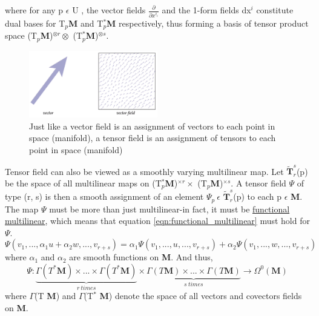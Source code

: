 where for any p $\epsilon$ U , the vector fields $\frac{\partial}{\partial x^{i_i}}$ and the 1-form fields dx$^i$ constitute dual bases for
T$_p$\textbf{M} and T$_p^*$\textbf{M} respectively, thus forming a basis of tensor product space (T$_p$\textbf{M})$^{\otimes r} \otimes$ (T$_p^*$\textbf{M})$^{\otimes s}$.

\begin{figure}[ht]
    \begin{center}
        \includegraphics[width=0.5\textwidth]{figures/vector_field.png}
        \caption{Just like a vector field is an assignment of vectors to each point in space (manifold),
        a tensor field is an assignment of tensors to each point in space (manifold)}
    \end{center}
\end{figure} 

Tensor field can also be viewed as a smoothly varying multilinear map. 
Let $\widetilde{\textbf{T}}^s_r$(p) be the space of all multilinear maps on (T$_p^*$\textbf{M})$^{\times r} \times$ (T$_p$\textbf{M})$^{\times s}$.
A tensor field $\Psi$ of type (r, s) is then a smooth assignment of an element $\Psi_p \: \epsilon$
$\widetilde{\textbf{T}}^s_r$(p) to each p $\epsilon$ \textbf{M}. 
The map $\Psi$ must be more than just multilinear-in fact, it must be \href{https://math.stackexchange.com/questions/2138459/understanding-the-definition-of-tensors-as-multilinear-maps}{functional multilinear}, 
which means that equation \ref{eqn:functional_multilinear} must hold for $\Psi$.
\begin{equation}
    \Psi(v_1, ..., \alpha_1 u + \alpha_2 w, ..., v_{r+s}) = \alpha_1 \Psi(v_1, ..., u, ..., v_{r+s}) + \alpha_2 \Psi(v_1, ..., w, ..., v_{r+s})
    \label{eqn:functional_multilinear}
\end{equation}
where $\alpha_1$ and $\alpha_2$ are smooth functions on \textbf{M}. And thus,
\begin{equation}
    \Psi: \underbrace{\Gamma(T^*\textbf{M}) \times ... \times \Gamma(T^*\textbf{M})}_{r \:times} \times \underbrace{\Gamma(T \textbf{M}) \times ... \times \Gamma(T \textbf{M})}_{s\: times} \rightarrow \Omega^0 (\textbf{M})
    \label{eqn:0-form}
\end{equation}
where $\Gamma$(T \textbf{M}) and $\Gamma$(T$^*$ \textbf{M}) denote the space of all vectors and covectors fields on \textbf{M}.

